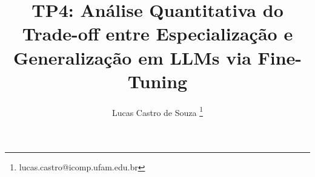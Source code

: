 \documentclass[journal,onecolumn]{IEEEtran}
\title{
    TP4: Análise Quantitativa do Trade-off entre Especialização e Generalização em LLMs via Fine-Tuning
}
\author[1]{Lucas Castro de Souza \thanks{lucas.castro@icomp.ufam.edu.br}}
\affil[1]{Universidade Federal do Amazonas - PPGI}
\begin{document}
\maketitle
\IEEEpeerreviewmaketitle

\end{document}
